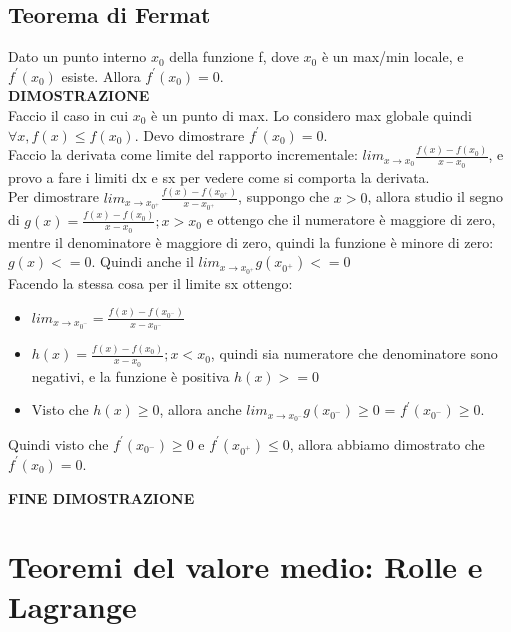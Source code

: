 \documentclass[11pt]{article}
\begin{document}
\subsection{Teorema di Fermat}
Dato un punto interno $x_{0}$ della funzione f, dove $x_{0}$ è un max/min locale, e $f^{'}(x_{0})$ esiste. Allora $f^{'}(x_{0}) = 0$.\\
\textbf{DIMOSTRAZIONE}\\
Faccio il caso in cui $x_{0}$ è un punto di max. Lo considero max globale quindi $\forall x, f(x) \le f(x_{0})$. Devo dimostrare $f^{'}(x_{0}) = 0$.\\
Faccio la derivata come limite del rapporto incrementale: $lim_{x \rightarrow x_{0}}\frac{f(x)-f(x_{0})}{x-x_{0}}$, e provo a fare i limiti dx e sx per vedere come si comporta la derivata.\\
Per dimostrare $lim_{x \rightarrow x_{0^{+}}}\frac{f(x)-f(x_{0^{+}})}{x-x_{0^{+}}}$, suppongo che $x > 0$, allora studio il segno di $g(x) = \frac{f(x)-f(x_{0})}{x-x_{0}}; x > x_{0}$ e ottengo che il numeratore è 
maggiore di zero, mentre il denominatore è maggiore di zero, quindi la funzione è minore di zero: $g(x) <= 0$. Quindi anche il $lim_{x \rightarrow x_{0^{+}}} g(x_{0^{+}}) <= 0$\\
Facendo la stessa cosa per il limite sx ottengo:\\
\begin{itemize}
    \item $lim_{x \rightarrow x_{0^{-}}} = \frac{f(x) - f(x_{0^{-}})}{x - x_{0^{-}}}$
    \item $h(x) = \frac{f(x)-f(x_{0})}{x-x_{0}}; x < x_{0}$, quindi sia numeratore che denominatore sono negativi, e la funzione è positiva $h(x) >= 0$
    \item Visto che $h(x) \ge 0$, allora anche $lim_{x \rightarrow x_{0^{-}}}g(x_{0^{-}}) \ge 0$ = $f^{'}(x_{0^{-}}) \ge 0$.
\end{itemize}
Quindi visto che $f^{'}(x_{0^{-}}) \ge 0$ e $f^{'}(x_{0^{+}}) \le 0$, allora abbiamo dimostrato che $f^{'}(x_{0}) = 0$.
\begin{center}
    \textbf{FINE DIMOSTRAZIONE}
\end{center}
\section{Teoremi del valore medio: Rolle e Lagrange}
\end{document}
